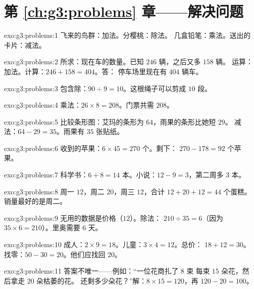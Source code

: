 \section*{第 \ref{ch:g3:problems} 章——解决问题}

\begin{solution}{exo:g3:problems:1}
飞来的鸟群：加法。分樱桃：除法。
几盒铅笔：乘法。送出的卡片：减法。
\end{solution}

\begin{solution}{exo:g3:problems:2}
所求：现在车的数量。已知 $246$ 辆，之后又多 $158$ 辆。
运算：加法。计算：$246 + 158 = 404$。答：
停车场里现在有 $404$ 辆车。
\end{solution}

\begin{solution}{exo:g3:problems:3}
包含除：$90 \div 9 = 10$。这根绳子可以剪成 $10$ 段。
\end{solution}

\begin{solution}{exo:g3:problems:4}
乘法：$26 \times 8 = 208$。门票共需 $208$。
\end{solution}

\begin{solution}{exo:g3:problems:5}
比较条形图：艾玛的条形为 $64$，雨果的条形比她短 $29$。
减法：$64 - 29 = 35$。雨果有 $35$ 张贴纸。
\end{solution}

\begin{solution}{exo:g3:problems:6}
收到的苹果：$6 \times 45 = 270$ 个。剩下：
$270 - 178 = 92$ 个苹果。
\end{solution}

\begin{solution}{exo:g3:problems:7}
科学书：$6 + 8 = 14$ 本。小说：$12 - 9 = 3$，第二周多 3 本。
\end{solution}

\begin{solution}{exo:g3:problems:8}
周一 $12$，周二 $20$，周三 $12$，合计
$12 + 20 + 12 = 44$ 个蛋糕。销量最好的是周二。
\end{solution}

\begin{solution}{exo:g3:problems:9}
无用的数据是价格（$12$）。除法：
$210 \div 35 = 6$（因为 $35 \times 6 = 210$）。里奥需要 $6$ 天。
\end{solution}

\begin{solution}{exo:g3:problems:10}
成人：$2 \times 9 = 18$。儿童：$3 \times 4 = 12$。总价：
$18 + 12 = 30$。找零：$50 - 30 = 20$。他们应找回 $20$。
\end{solution}

\begin{solution}{exo:g3:problems:11}
答案不唯一——例如：“一位花商扎了 $8$ 束
每束 $15$ 朵花，然后拿走 $20$ 朵枯萎的花。
还剩多少朵花？”解：$8 \times 15 = 120$，再 $120 - 20 = 100$。
\end{solution}
